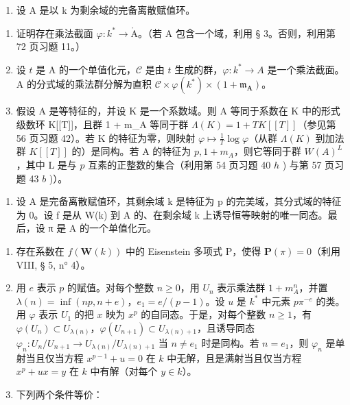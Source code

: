 \begin{enumerate}
\def\labelenumi{\arabic{enumi})}
\setcounter{enumi}{15}
\tightlist
\item
  设 A 是以 k 为剩余域的完备离散赋值环。
\end{enumerate}

\begin{enumerate}
\def\labelenumi{\alph{enumi})}
\item
  证明存在乘法截面 \(\varphi:k^{*}\to\mathring{\mathrm{A}}\)。（若 A 包含一个域，利用 § 3。否则，利用第 72 页习题 11。）
\item
  设 \(t\) 是 A 的一个单值化元，\(\mathcal{C}\) 是由 \(t\) 生成的群，\(\varphi:k^{*}\to A\) 是一个乘法截面。A 的分式域的乘法群分解为直积 \(\mathcal{C}\times\varphi(k^{*})\times(1+\mathfrak{m}_{\mathbf{A}})\)。
\item
  假设 A 是等特征的，并设 K 是一个系数域。则 A 等同于系数在 K 中的形式级数环 K{[}{[}T{]}{]}，且群 1 + m\_A 等同于群 \(\Lambda(K) = 1 + TK[[T]]\)（参见第 56 页习题 42）。若 K 的特征为零，则映射 \(\varphi \mapsto \frac{1}{T} \log \varphi\)（从群 \(\Lambda(K)\) 到加法群 \(K[[T]]\) 的）是同构。若 A 的特征为 \(p, 1 + m_A\)，则它等同于群 \(W(A)^L\)，其中 L 是与 \(p\) 互素的正整数的集合（利用第 54 页习题 40 \(h\) ) 与第 57 页习题 43 \(b\) )）。
\end{enumerate}

\begin{enumerate}
\def\labelenumi{\arabic{enumi})}
\setcounter{enumi}{16}
\tightlist
\item
  设 A 是完备离散赋值环，其剩余域 k 是特征为 p 的完美域，其分式域的特征为 0。设 f 是从 W(k) 到 A 的、在剩余域 k 上诱导恒等映射的唯一同态。最后，设 π 是 A 的一个单值化元。
\end{enumerate}

\begin{enumerate}
\def\labelenumi{\alph{enumi})}
\item
  存在系数在 \(f(\mathbf{W}(k))\) 中的 Eisenstein 多项式 P，使得 \(\mathbf{P}(\pi)=0\)（利用 VIII, § 5, n° 4）。
\item
  用 \(e\) 表示 \(p\) 的赋值。对每个整数 \(n \geqslant 0\)，用 \(U_n\) 表示乘法群 \(1 + m_A^n\)，并置 \(\lambda(n) = \inf(np, n + e)\)，\(e_1 = e/(p - 1)\)。设 \(u\) 是 \(k^*\) 中元素 \(p\pi^{-e}\) 的类。用 \(\varphi\) 表示 \(U_1\) 的把 \(x\) 映为 \(x^p\) 的自同态。于是，对每个整数 \(n \geqslant 1\)，有 \(\varphi(U_n) \subset U_{\lambda(n)}\)，\(\varphi(U_{n+1}) \subset U_{\lambda(n)+1}\)，且诱导同态 \(\varphi_n: U_n/U_{n+1} \to U_{\lambda(n)}/U_{\lambda(n)+1}\) 当 \(n \neq e_1\) 时是同构。若 \(n = e_1\)，则 \(\varphi_n\) 是单射当且仅当方程 \(x^{p-1} + u = 0\) 在 \(k\) 中无解，且是满射当且仅当方程 \(x^p + ux = y\) 在 \(k\) 中有解（对每个 \(y \in k\)）。
\item
  下列两个条件等价：
\end{enumerate}

